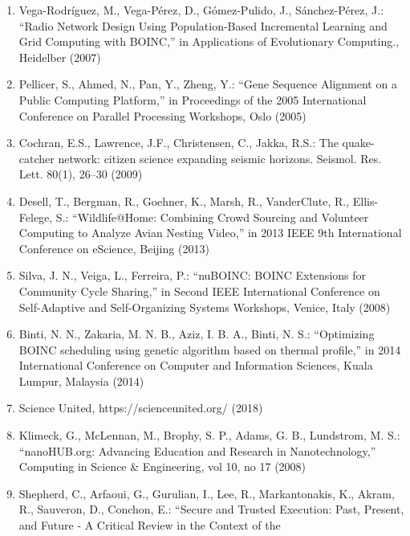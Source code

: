 \documentclass[
]{article}
\begin{document}
\begin{enumerate}
\def\labelenumi{\arabic{enumi}.}
\setcounter{enumi}{57}
\item
  Vega-Rodríguez, M., Vega-Pérez, D., Gómez-Pulido, J., Sánchez-Pérez,
  J.: ``Radio Network Design Using Population-Based Incremental Learning
  and Grid Computing with BOINC,'' in Applications of Evolutionary
  Computing., Heidelber (2007)\\
\item
  Pellicer, S., Ahmed, N., Pan, Y., Zheng, Y.: ``Gene Sequence Alignment
  on a Public Computing Platform,'' in Proceedings of the 2005
  International Conference on Parallel Processing Workshops, Oslo
  (2005)\\
\item
  Cochran, E.S., Lawrence, J.F., Christensen, C., Jakka, R.S.: The
  quake-catcher network: citizen science expanding seismic horizons.
  Seismol. Res. Lett. 80(1), 26--30 (2009)\\
\item
  Desell, T., Bergman, R., Goehner, K., Marsh, R., VanderClute, R.,
  Ellis-Felege, S.: ``Wildlife@Home: Combining Crowd Sourcing and
  Volunteer Computing to Analyze Avian Nesting Video,'' in 2013 IEEE 9th
  International Conference on eScience, Beijing (2013)\\
\item
  Silva, J. N., Veiga, L., Ferreira, P.: ``nuBOINC: BOINC Extensions for
  Community Cycle Sharing,'' in Second IEEE International Conference on
  Self-Adaptive and Self-Organizing Systems Workshops, Venice, Italy
  (2008)\\
\item
  Binti, N. N., Zakaria, M. N. B., Aziz, I. B. A., Binti, N. S.:
  ``Optimizing BOINC scheduling using genetic algorithm based on thermal
  profile,'' in 2014 International Conference on Computer and
  Information Sciences, Kuala Lumpur, Malaysia (2014)\\
\item
  Science United, https://scienceunited.org/ (2018)
\item
  Klimeck, G., McLennan, M., Brophy, S. P., Adams, G. B., Lundstrom, M.
  S.: ``nanoHUB.org: Advancing Education and Research in
  Nanotechnology,'' Computing in Science \& Engineering, vol 10, no 17
  (2008)\\
\item
  Shepherd, C., Arfaoui, G., Gurulian, I., Lee, R., Markantonakis, K.,
  Akram, R., Sauveron, D., Conchon, E.: ``Secure and Trusted Execution:
  Past, Present, and Future - A Critical Review in the Context of the

\end{enumerate}
\end{document}
